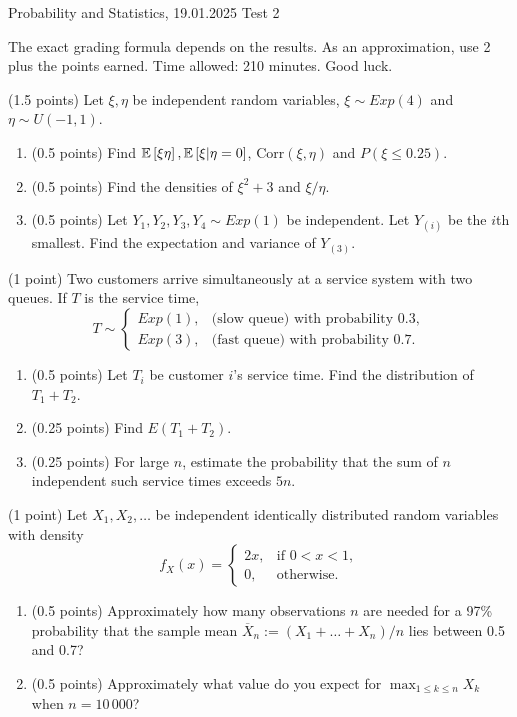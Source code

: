 \documentclass[a4paper]{report}
\begin{document}
\vspace{1ex}
\noindent Probability and Statistics, 19.01.2025 \hfill Test 2

\hrulefill

\begin{it}
The exact grading formula depends on the results. As an approximation, use 2 plus the points earned. Time allowed: 210 minutes. Good luck.
\end{it}
\vspace{1ex}


\begin{problem} (1.5 points)
Let $\xi,\eta$ be independent random variables,
$\xi\sim Exp(4)$ and $\eta\sim U(-1,1)$.
\begin{enumerate}
    \item (0.5 points) Find
    $\mathbb {E}\left[ \xi \eta\right], \mathbb {E}\left[ \xi|
    \eta=0\right]$, $\mathrm{Corr}(\xi,\eta)$ and $P(\xi\leq0.25)$.
    \item (0.5 points) Find the densities of $\xi^2+3$ and $\xi/
\eta$.
\item (0.5 points)
Let $Y_1,Y_2,Y_3,Y_4\sim Exp(1)$ be independent. Let $Y_{(i)}$ be the $i$th smallest.
Find the expectation and variance of $Y_{(3)}$.
\end{enumerate}
\end{problem}


\begin{problem}
(1 point)
Two customers arrive simultaneously at a service system
with two queues. If $T$
is the service time,
\[
T \sim
\begin{cases}
Exp(1), &\text{(slow queue) with probability }0.3,\\
Exp(3), &\text{(fast queue) with probability }0.7.
\end{cases}
\]
\begin{enumerate}
    \item (0.5 points) Let $T_i$ be customer $i$'s service time. Find the distribution of $T_1+T_2$.
    \item (0.25 points) Find $E(T_1+T_2)$.
    \item (0.25 points) For large $n$, estimate the probability that the sum of $n$ independent such service times
    exceeds $5n$.
\end{enumerate}
\end{problem}


\begin{problem}
(1 point)
Let $X_1,X_2,\dots$ be independent identically distributed random variables
with density
\[
f_X(x) =
\begin{cases}
2x, &\text{if }0<x<1,\\
0, &\text{otherwise}.
\end{cases}
\]
\begin{enumerate}
    \item (0.5 points) Approximately how many observations $n$ are needed for a 97\% probability
    that the sample mean $\overline X_n:=(X_1+\dots+X_n)/n$ lies between 0.5 and 0.7?
    \item (0.5 points) Approximately what value do you expect for $\max_{1\leq k\leq n}X_k$ when $n=10\,000$?
\end{enumerate}
\end{problem}
\end{document}
